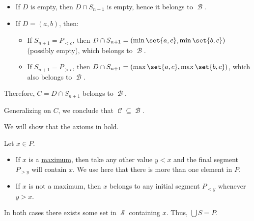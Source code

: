 \begin{defproof}
\begin{itemize}
    \item If \( D \) is empty, then \( D \cap S_{n+1} \) is empty, hence it belongs to \( \mscrB \).

    \item If \( D = (a, b) \), then:
    \begin{itemize}
      \item If \( S_{n+1} = P_{<c} \), then \( D \cap S_{n+1} = (\min\set{a, c}, \min\set{b, c}) \) (possibly empty), which belongs to \( \mscrB \).
      \item If \( S_{n+1} = P_{>c} \), then \( D \cap S_{n+1} = (\max\set{a, c}, \max\set{b, c}) \), which also belongs to \( \mscrB \).
    \end{itemize}
  \end{itemize}

  Therefore, \( C = D \cap S_{n+1} \) belongs to \( \mscrB \).

  Generalizing on \( C \), we conclude that \( \mscrC \subseteq \mscrB \).

   We will show that the axioms in  hold.

   Let \( x \in P \).

  \begin{itemize}
    \item If \( x \) is a \hyperref[def:extremal_points/maximum_and_minimum]{maximum}, then take any other value \( y < x \) and the final segment \( P_{>y} \) will contain \( x \). We use here that there is more than one element in \( P \).

    \item If \( x \) is not a maximum, then \( x \) belongs to any initial segment \( P_{<y} \) whenever \( y > x \).
  \end{itemize}

  In both cases there exists some set in \( \mscrS \) containing \( x \). Thus, \( \bigcup S = P \).


\end{defproof}
